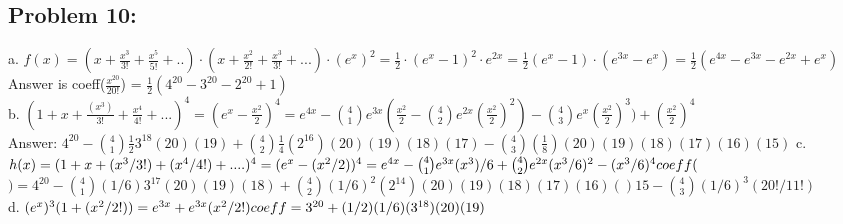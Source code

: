 \documentclass[15pt]{article}
\begin{document}
\subsection*{Problem 10:}
a. $f(x) = (x + \frac{x^3}{3!}+ \frac{x^5}{5!}+..)\cdot (x+ \frac{x^2}{2!} + \frac{x^3}{3!}+...)\cdot {(e^x)}^2 = \frac{1}{2}\cdot {(e^x-1)^2}\cdot {e^{2x}} = \frac{1}{2}(e^{x}-1)\cdot ({e^{3x}-e^{x}}) = \frac{1}{2} (e^{4x}-e^{3x}-e^{2x}+e^{x}) $
Answer is coeff($\frac{x^{20}}{20!}$) = $\frac{1}{2}(4^{20}-3^{20}-2^{20}+1)$ \\
b. $(1+x+\frac{(x^3)}{3!}+ \frac{x^4}{4!}+...)^4 = (e^x -\frac{x^2}{2})^4 = e^{4x}-{4\choose 1} e^{3x}(\frac{x^2}{2}-{4\choose 2}e^{2x}(\frac{x^2}{2})^2)- {4\choose 3}e^{x}(\frac{x^2}{2})^3) + (\frac{x^2}{2})^4$ \\
Answer: $4^{20} - {4\choose 1}\frac{1}{2}3^{18}(20)(19) + {4 \choose 2}\frac{1}{4}(2^{16})(20)(19)(18)(17) - {4 \choose 3}(\frac{1}{8})(20)(19)(18)(17)(16)(15)$
c.$h(x) = (1 + x + (x^3/3!)+(x^4/4!)+....)^4 = (e^x - (x^2/2))^4 = e^{4x} - {4 \choose 1}e^{3x}{(x^3)/6}+ {4 \choose 2}e^{2x}(x^3/6)^2 - (x^3/6)^4\\coeff($$) = 4^{20} - {4 \choose 1}(1/6)3^{17}(20)(19)(18) + {4\choose 2 }(1/6)^2(2^{14})(20)(19)(18)(17)(16)()15 - {4\choose 3}(1/6)^3(20!/11!)$\\
d. $(e^x)^3(1+(x^2/2!)) = e^{3x} + e^{3x}(x^2/2!)\\coeff = 3^{20} + (1/2)(1/6)(3^{18})(20)(19) $
\end{document}
